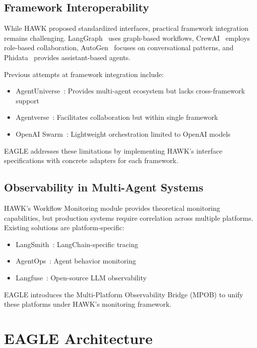\documentclass[conference]{IEEEtran}
\begin{document}
\subsection{Framework Interoperability}

While HAWK proposed standardized interfaces, practical framework integration remains challenging. LangGraph~\cite{langgraph2024} uses graph-based workflows, CrewAI~\cite{crewai2024} employs role-based collaboration, AutoGen~\cite{wu2023autogen} focuses on conversational patterns, and Phidata~\cite{phidata2024} provides assistant-based agents. 

Previous attempts at framework integration include:
\begin{itemize}
    \item AgentUniverse~\cite{agentuniverse2024}: Provides multi-agent ecosystem but lacks cross-framework support
    \item Agentverse~\cite{chen2023agentverse}: Facilitates collaboration but within single framework
    \item OpenAI Swarm~\cite{swarm2024}: Lightweight orchestration limited to OpenAI models
\end{itemize}

EAGLE addresses these limitations by implementing HAWK's interface specifications with concrete adapters for each framework.

\subsection{Observability in Multi-Agent Systems}

HAWK's Workflow Monitoring module provides theoretical monitoring capabilities, but production systems require correlation across multiple platforms. Existing solutions are platform-specific:
\begin{itemize}
    \item LangSmith~\cite{langsmith2024}: LangChain-specific tracing
    \item AgentOps~\cite{agentops2024}: Agent behavior monitoring
    \item Langfuse~\cite{langfuse2024}: Open-source LLM observability
\end{itemize}

EAGLE introduces the Multi-Platform Observability Bridge (MPOB) to unify these platforms under HAWK's monitoring framework.

\section{EAGLE Architecture}
\end{document}
